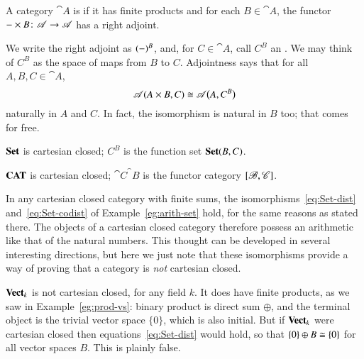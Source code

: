 \begin{defn}
A category $\cat{A}$ is  if it has finite products
and for each $B \in \cat{A}$, the functor $\dashbk \times B\from \cat{A}
\to \cat{A}$ has a right adjoint.
\end{defn}
% 
We write the right adjoint as $(-)^B$,%
% 
%
and, for $C \in \cat{A}$, call
$C^B$ an .%
%
%
We may think of $C^B$ as the space of maps from $B$ to $C$.  Adjointness
says that for all $A, B, C \in \cat{A}$,
\[
\mathscr{A}(A \times B, C)
\cong
\mathscr{A}\bigl(A, C^B\bigr)
\]
naturally in $A$ and $C$.  In fact, the isomorphism is natural in $B$ too;
that comes for free.

\begin{example}
$\mathbf{Set}$ is cartesian closed; $C^B$ is the function%
%
%
%
set $\mathbf{Set}(B, C)$.  
\end{example}

\begin{example}
\hspace*{-.5pt}%
$\mathbf{CAT}$ is cartesian closed; $\cat{C}^\cat{B}$ is the functor%
%
%
category $[\mathscr{B},\mathscr{C}]$.
\end{example}

In any cartesian closed category with finite sums, the
isomorphisms~\eqref{eq:Set-dist} and~\eqref{eq:Set-codist} of
Example~\ref{eg:arith-set} hold, for the same reasons as stated there.  The
objects of a cartesian closed category therefore possess an arithmetic%
%
%
like that of the natural numbers.  This thought can be developed in several
interesting directions, but here we just note that these isomorphisms
provide a way of proving that a category is \emph{not} cartesian closed.

\begin{example}
$\mathbf{Vect}_k$%
%
%
is not cartesian closed, for any field $k$.  It does have finite products,
as we saw in Example~\ref{eg:prod-vs}: binary product is direct sum
$\oplus$, and the terminal object is the trivial vector space $\{0\}$,
which is also initial.  But if $\mathbf{Vect}_k$ were cartesian closed then
equations~\eqref{eq:Set-dist} would hold, so that $\{0\} \oplus B \cong
\{0\}$ for all vector spaces $B$.  This is plainly false.
\end{example}


